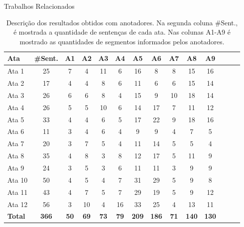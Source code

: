 \begin{frame}{Trabalhos Relacionados}
\begin{center}
\begin{figure}[h!]
	\end{figure}
\end{center}











\begin{table}[!h]
	\centering
	\begin{tabular}{|l|c|c|c|c|c|c|c|c|c|c|c|c|c|} \hline
		\textbf{Ata} & \textbf{\#Sent.}  & 
		\textbf{A1}  & 
		\textbf{A2}  & 
		\textbf{A3}  & 
		\textbf{A4}  & 
		\textbf{A5}  & 
		\textbf{A6}  & 
		\textbf{A7}  & 
		\textbf{A8}  & 
		\textbf{A9} 
		\\	\hline
		Ata 1  & 25 & 7  & 4  & 11 & 6  & 16 & 8  & 8  & 15 & 16 \\ \hline 
		Ata 2  & 17 & 4  & 4  & 8  & 6  & 11 & 6  & 6  & 15 & 14 \\ \hline 
		Ata 3  & 26 & 6  & 6  & 8  & 4  & 15 & 9  & 10 & 18 & 14 \\ \hline 
		Ata 4  & 26 & 5  & 5  & 10 & 6  & 14 & 17 & 7  & 11 & 12 \\ \hline 
		Ata 5  & 33 & 4  & 4  & 6  & 5  & 17 & 22 & 9  & 18 & 16 \\ \hline 
		Ata 6  & 11 & 3  & 4  & 6  & 4  & 9  & 9  & 4  & 7  &  5 \\ \hline 
		Ata 7  & 20 & 3  & 7  & 5  & 4  & 11 & 14 & 5  & 5  &  4 \\ \hline 
		Ata 8  & 35 & 4  & 8  & 3  & 8  & 12 & 17 & 5  & 11 &  9 \\ \hline 
		Ata 9  & 24 & 3  & 5  & 3  & 6  & 11 & 11 & 3  & 9  &  9 \\ \hline 
		Ata 10 & 50 & 4  & 5  & 4  & 7  & 31 & 29 & 5  & 9  &  8 \\ \hline 
		Ata 11 & 43 & 4  & 7  & 5  & 7  & 29 & 19 & 5  & 9  & 12 \\ \hline 
		Ata 12 & 56 & 3  & 10 & 4  & 16 & 33 & 25 & 4  & 13 & 11 \\ \hline 
		\textbf{Total} &
		\textbf{366} & 
		\textbf{50}&  
		\textbf{69} & 
		\textbf{73}&  
		\textbf{79}&  
		\textbf{209} & 
		\textbf{186}&  
		\textbf{71}&  
		\textbf{140}&  
		\textbf{130} 
		\\ \hline 

	\end{tabular}
	\caption{Descrição dos resultados obtidos com anotadores. Na segunda coluna \#Sent., é mostrada a quantidade de sentenças de cada ata. Nas colunas A1-A9 é mostrado as quantidades de segmentos informados pelos anotadores. 
} 


\end{table}
\end{frame}
